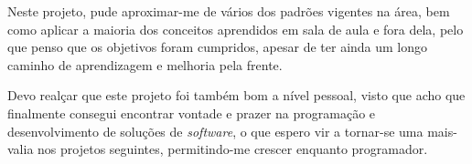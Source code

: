 \documentclass[11pt]{scrartcl} %
\begin{document}
 Neste projeto, pude aproximar-me de vários dos padrões vigentes na área, bem como aplicar a maioria dos conceitos aprendidos em sala de aula e fora dela, pelo que penso que os objetivos foram cumpridos, apesar de ter ainda um longo caminho de aprendizagem e melhoria pela frente.
 
 Devo realçar que este projeto foi também bom a nível pessoal, visto que acho que finalmente consegui encontrar vontade e prazer na programação e desenvolvimento de soluções de \textit{software}, o que espero vir a tornar-se uma mais-valia nos projetos seguintes, permitindo-me crescer enquanto programador. 
\end{document}
